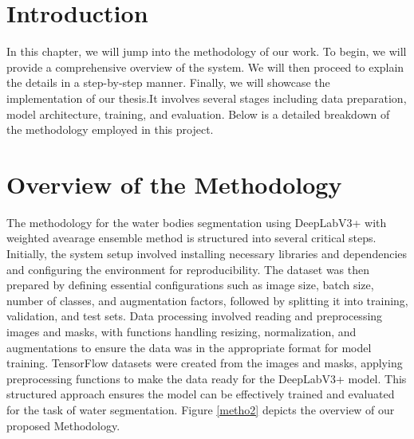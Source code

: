 \section{Introduction}
In this chapter, we will jump into the methodology of our work. To begin, we will provide a comprehensive overview of the system. We will then proceed to explain the details in a step-by-step manner. Finally, we will showcase the implementation of our thesis.It involves several stages including data preparation, model architecture, training, and evaluation. Below is a detailed breakdown of the methodology employed in this project.


\section{Overview of the Methodology}
The methodology for the water bodies segmentation using DeepLabV3+ with weighted avearage ensemble method is structured into several critical steps. Initially, the system setup involved installing necessary libraries and dependencies and configuring the environment for reproducibility. The dataset was then prepared by defining essential configurations such as image size, batch size, number of classes, and augmentation factors, followed by splitting it into training, validation, and test sets. Data processing involved reading and preprocessing images and masks, with functions handling resizing, normalization, and augmentations to ensure the data was in the appropriate format for model training. TensorFlow datasets were created from the images and masks, applying preprocessing functions to make the data ready for the DeepLabV3+ model. This structured approach ensures the model can be effectively trained and evaluated for the task of water segmentation. Figure \ref{metho2} depicts the overview of our proposed Methodology.



